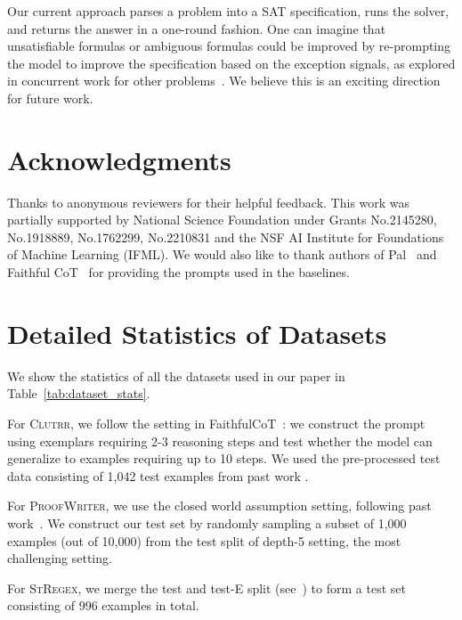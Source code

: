 \documentclass{article}
\theoremstyle{definition}
\newcommand{\clutrr}{\textsc{Clutrr}}
\newcommand{\proofwriter}{\textsc{ProofWriter}}
\newcommand{\stregex}{\textsc{StRegex}}
\begin{document}
Our current approach parses a problem into a SAT specification, runs the solver, and returns the answer in a one-round fashion. One can imagine that unsatisfiable formulas or ambiguous formulas could be improved by re-prompting the model to improve the specification based on the exception signals, as explored in concurrent work for other problems~\citep{paul2023refiner,madaan2023self,chen2023teaching}. We believe this is an exciting direction for future work.

\section*{Acknowledgments}

Thanks to anonymous reviewers for their helpful feedback. This work was partially supported by National Science Foundation under Grants  No.2145280, No.1918889, No.1762299, No.2210831 and the NSF AI Institute for Foundations of Machine Learning (IFML). We would also like to thank authors of Pal~\citep{pal} and Faithful CoT~\citep{faithfulcot} for providing the prompts used in the baselines.



\newpage
\appendix

\section{Detailed Statistics of Datasets}
\label{app:dataset_stats}

We show the statistics of all the datasets used in our paper in Table~\ref{tab:dataset_stats}.

For \clutrr{}, we follow the setting in {\sc FaithfulCoT}~\citep{faithfulcot}: we construct the prompt using exemplars requiring 2-3 reasoning steps and test whether the model can generalize to examples requiring up to 10 steps. We used the pre-processed test data consisting of 1,042 test examples from past work \citep{faithfulcot}. 

For \proofwriter{}, we use the closed world assumption setting, following past work~\citep{creswell2023selectioninference}. We construct our test set by randomly sampling a subset of 1,000 examples (out of 10,000) from the test split of depth-5 setting, the most challenging setting.

For \stregex{}, we merge the test and test-E split (see~\citet{structuredregex}) to form a test set consisting of 996 examples in total.
\end{document}
